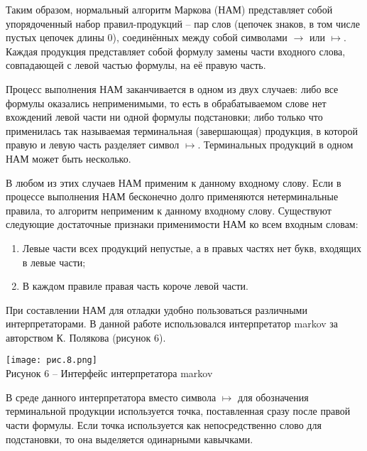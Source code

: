 \documentclass{article}
\begin{document}
\par Таким образом, нормальный алгоритм Маркова (НАМ) представляет собой упорядоченный набор правил-продукций – пар слов (цепочек знаков, в том числе пустых цепочек длины 0), соединённых между собой символами $\rightarrow$ или $\mapsto$. Каждая продукция представляет собой формулу замены части входного слова, совпадающей с левой частью формулы, на её правую часть.\\

\par Процесс выполнения НАМ заканчивается в одном из двух случаев: либо все формулы оказались неприменимыми, то есть в обрабатываемом слове нет вхождений левой части ни одной формулы подстановки; либо только что применилась так называемая терминальная (завершающая) продукция, в которой правую и левую часть разделяет символ $\mapsto$. Терминальных продукций в одном НАМ может быть несколько.\\

\par В любом из этих случаев НАМ применим к данному входному слову. Если в процессе выполнения НАМ бесконечно долго применяются нетерминальные правила, то алгоритм неприменим к данному входному слову. Существуют следующие достаточные признаки применимости НАМ ко всем входным словам:

\begin{enumerate}
    \item Левые части всех продукций непустые, а в правых частях нет букв, входящих в левые части;
    \item В каждом правиле правая часть короче левой части.
\end{enumerate}

\par При составлении НАМ для отладки удобно пользоваться различными интерпретаторами. В данной работе использовался интерпретатор markov за авторством К. Полякова (рисунок 6).


\begin{center}
    \texttt{[image: рис.8.png]}\\
    \small{Рисунок 6 – Интерфейс интерпретатора markov}
    \vspace{0.5cm}
\end{center}

\par В среде данного интерпретатора вместо символа $\mapsto$ для обозначения терминальной продукции используется точка, поставленная сразу после правой части формулы. Если точка используется как непосредственно слово для подстановки, то она выделяется одинарными кавычками.\\
\end{document}
